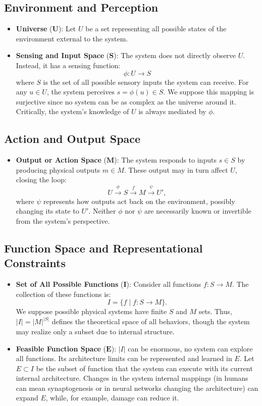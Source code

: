 \documentclass[]{article}
\begin{document}
\subsection{Environment and Perception}
\begin{itemize}
	\item \textbf{Universe} ($\mathbf{U}$): Let $U$ be a set representing all possible states of the environment external to the system.
	\item \textbf{Sensing and Input Space} ($\mathbf{S}$): The system does not directly observe $U$. Instead, it has a sensing function:
	\[ \phi: U \to S \]
	where $S$ is the set of all possible sensory inputs the system can receive. For any $u \in U$, the system perceives $s = \phi(u) \in S$. We suppose this mapping is surjective since no system can be as complex as the universe around it. Critically, the system’s knowledge of $U$ is always mediated by $\phi$.
\end{itemize}

\subsection{Action and Output Space}
\begin{itemize}
	\item \textbf{Output or Action Space} ($\mathbf{M}$): The system responds to inputs $s \in S$ by producing physical outputs $m \in M$. These output may in turn affect $U$, closing the loop:
	\[ U \xrightarrow{\phi} S \xrightarrow{f} M \xrightarrow{\psi} U', \]
	where $\psi$ represents how outputs act back on the environment, possibly changing its state to $U'$. Neither $\phi$ nor $\psi$ are necessarily known or invertible from the system's perspective.
\end{itemize}

\subsection{Function Space and Representational Constraints}
\begin{itemize}
	\item \textbf{Set of All Possible Functions} ($\mathbf{I}$): Consider all functions $f: S \to M$. The collection of these functions is:
	\[ I = \{ f \mid f: S \to M \}. \]
	We suppose possible physical systems have finite $S$ and $M$ sets. Thus, $| I | = | M | ^ {| S |}$ defines the theoretical space of all behaviors, though the system may realize only a subset due to internal structure.
	\item \textbf{Feasible Function Space} ($\mathbf{E}$): $|I|$ can be enormous, no system can explore all functions. Its architecture limits can be represented and learned in $E$. Let $E \subset I$ be the subset of function that the system can execute with its current internal architecture. Changes in the system internal mappings (in humans can mean synaptogenesis or in neural networks changing the architecture) can expand $E$, while, for example, damage can reduce it.
\end{itemize}
\end{document}
